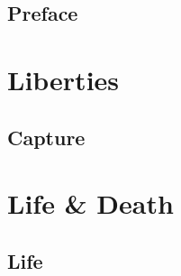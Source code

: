 \tableofcontents

\frontmatter

\chapter{Preface}

\mainmatter

\part{Liberties}

\chapter{Capture}


\part{Life \& Death}

\chapter{Life}


